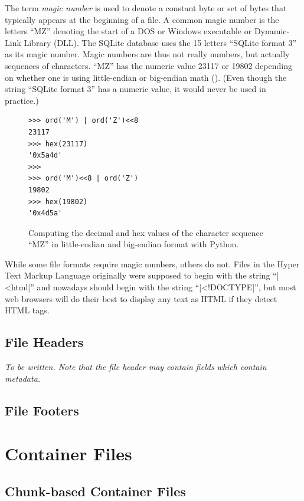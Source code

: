 \documentclass[11pt,letter]{article}
\begin{document}
The term \emph{magic number} is used to denote a constant byte or set
of bytes that typically appears at the beginning of a file. A common
magic number is the letters ``MZ'' denoting the start of a DOS or
Windows executable or Dynamic-Link Library (DLL). The SQLite database
uses the 15 letters ``SQLite format 3'' as its magic number. Magic numbers are
thus not really numbers, but actually sequences of characters. ``MZ'' has
the numeric value 23117 or 19802 depending on whether one is using
little-endian or big-endian math (). (Even though the
string ``SQLite format 3'' has a numeric value, it would never be used
in practice.)

\begin{figure}
\begin{Verbatim}
>>> ord('M') | ord('Z')<<8
23117
>>> hex(23117)
'0x5a4d'
>>> 
>>> ord('M')<<8 | ord('Z')
19802
>>> hex(19802)
'0x4d5a'
\end{Verbatim}
\caption{Computing the decimal and hex values of the character
  sequence ``MZ'' in little-endian and big-endian format with
  Python.}\label{calc-mz}
\end{figure}

While some file formats require magic numbers, others do not. Files in
the Hyper Text Markup Language originally were supposed to begin with
the string ``|<html|'' and nowadays should begin with the string
``|<!DOCTYPE|'', but most web browsers will do their best to display
any text as HTML if they detect HTML tags.

\subsection{File Headers}

\emph{To be written. Note that the file header may contain fields
  which contain metadata.}

\subsection{File Footers}

\section{Container Files}

\subsection{Chunk-based Container Files}
\end{document}
